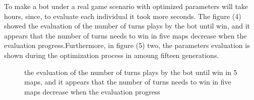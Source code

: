 \documentclass[conference]{IEEEtran}
\begin{document}
To make a bot under a real game scenario with optimized parameters will take hours, since, to evaluate each individual it took more seconds. The figure (4) showed the evaluation of the number of turns plays by the bot until win, and it appears that the number of turns needs to win in five maps decrease when the evaluation progress.Furthermore, in figure (5) two, the parameters evaluation is shown during the optimization process in amoung fifteen generations. \\

\begin{figure}
\begin{center}
\end{center}
\caption{the evaluation of the number of turns plays by the bot until win in 5 maps, and it appears that the number of turns needs to win in five maps decrease when the evaluation progress}
\end{figure}
\end{document}
